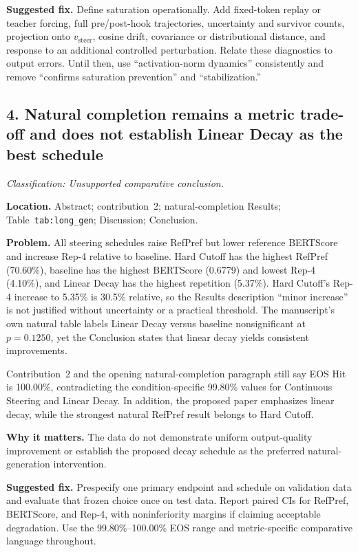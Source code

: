 \documentclass[11pt]{article}
\newcommand{\findinglabel}[1]{\textbf{#1}}
\newcommand{\classification}[1]{\textit{Classification: #1.}}
\begin{document}
\findinglabel{Suggested fix.} Define saturation operationally.  Add fixed-token replay or teacher forcing, full pre/post-hook trajectories, uncertainty and survivor counts, projection onto $v_{\text{steer}}$, cosine drift, covariance or distributional distance, and response to an additional controlled perturbation.  Relate these diagnostics to output errors.  Until then, use ``activation-norm dynamics'' consistently and remove ``confirms saturation prevention'' and ``stabilization.''

\subsection*{4. Natural completion remains a metric trade-off and does not establish Linear Decay as the best schedule}

\classification{Unsupported comparative conclusion}

\findinglabel{Location.} Abstract; contribution~2; natural-completion Results; Table~\texttt{tab:long\_gen}; Discussion; Conclusion.

\findinglabel{Problem.} All steering schedules raise RefPref but lower reference BERTScore and increase Rep-4 relative to baseline.  Hard Cutoff has the highest RefPref (70.60\%), baseline has the highest BERTScore (0.6779) and lowest Rep-4 (4.10\%), and Linear Decay has the highest repetition (5.37\%).  Hard Cutoff's Rep-4 increase to 5.35\% is 30.5\% relative, so the Results description ``minor increase'' is not justified without uncertainty or a practical threshold.  The manuscript's own natural table labels Linear Decay versus baseline nonsignificant at $p=0.1250$, yet the Conclusion states that linear decay yields consistent improvements.

Contribution~2 and the opening natural-completion paragraph still say EOS Hit is 100.00\%, contradicting the condition-specific 99.80\% values for Continuous Steering and Linear Decay.  In addition, the proposed paper emphasizes linear decay, while the strongest natural RefPref result belongs to Hard Cutoff.

\findinglabel{Why it matters.} The data do not demonstrate uniform output-quality improvement or establish the proposed decay schedule as the preferred natural-generation intervention.

\findinglabel{Suggested fix.} Prespecify one primary endpoint and schedule on validation data and evaluate that frozen choice once on test data.  Report paired CIs for RefPref, BERTScore, and Rep-4, with noninferiority margins if claiming acceptable degradation.  Use the 99.80\%--100.00\% EOS range and metric-specific comparative language throughout.
\end{document}
